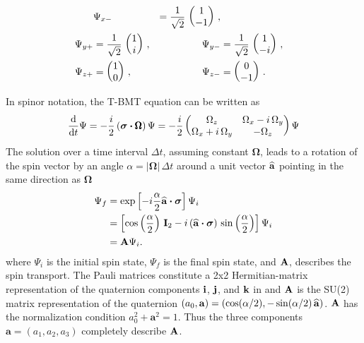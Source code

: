{\begin{align}
  &\Psi_{x-} &= \frac{1}{\sqrt{2}} \, \begin{pmatrix} 1 \\ -1 \end{pmatrix} \, , \nonumber \\
   \Psi_{y+} &= \frac{1}{\sqrt{2}} \, \begin{pmatrix} 1 \\ i \end{pmatrix} \, , 
  &\Psi_{y-} &= \frac{1}{\sqrt{2}} \, \begin{pmatrix} 1 \\ -i \end{pmatrix} \, , \\
   \Psi_{z+} &=                       \begin{pmatrix} 1 \\ 0 \end{pmatrix} \, , 
  &\Psi_{z-} &=                       \begin{pmatrix} 0 \\ -1 \end{pmatrix} \, . \nonumber
\end{align}

In spinor notation, the T-BMT equation can be written as
  \begin{equation}   
    \frac{\mathrm{d}}{\mathrm{d} t} \Psi = - \frac{i}{2} \left( \boldsymbol{\sigma} \mathbin{\boldsymbol{\cdot}}   
    {\pmb\Omega} \right) \Psi = -\frac{i}{2} \begin{pmatrix}
    \Omega_z & \Omega_x - i \, \Omega_y \\
    \Omega_x + i \, \Omega_y & -\Omega_z \end{pmatrix}
    \Psi
  \end{equation}
The solution over a time interval $\Delta t$, assuming constant $\pmb\Omega$, leads to a rotation of
the spin vector by an angle $\alpha = |\pmb\Omega| \, \Delta t$ around a unit vector ${\widehat{\bf a}}$
pointing in the same direction as $\pmb\Omega$
  \begin{align}   
    \Psi_f &= \exp \left[ -i \frac{\alpha}{2} {\widehat{\bf a}} \mathbin{\boldsymbol{\cdot}} \boldsymbol{\sigma} \right] \Psi_i \nonumber \\
         &= \left[ \cos \left( \frac{\alpha}{2} \right) \, {\bf I}_{2} - 
            i \, ({\widehat{\bf a}} \mathbin{\boldsymbol{\cdot}} \boldsymbol{\sigma}) \, \sin \left( \frac{\alpha}{2} \right) \right] \Psi_i \\
         &= {\bf A} \Psi_i. \nonumber
  \end{align}   
where $\Psi_i$ is the initial spin state, $\Psi_f$ is the final spin state, and ${\bf A}$, describes
the spin transport. The Pauli matrices constitute a 2x2 Hermitian-matrix representation of the
quaternion components ${\bf i}$, ${\bf j}$, and ${\bf k}$ in  and ${\bf A}$ is the SU(2) matrix representation
of the quaternion $(a_0, {\bf a}) = (\cos(\alpha/2), -\sin(\alpha/2) \, {\widehat{\bf a}})$. ${\bf A}$ has the
normalization condition $a_{0}^{2} + \boldsymbol{a}^{2} = 1$. Thus the three components
$\boldsymbol{a} = \left(a_{1}, a_{2}, a_{3}\right)$ completely describe ${\bf A}$.

}
